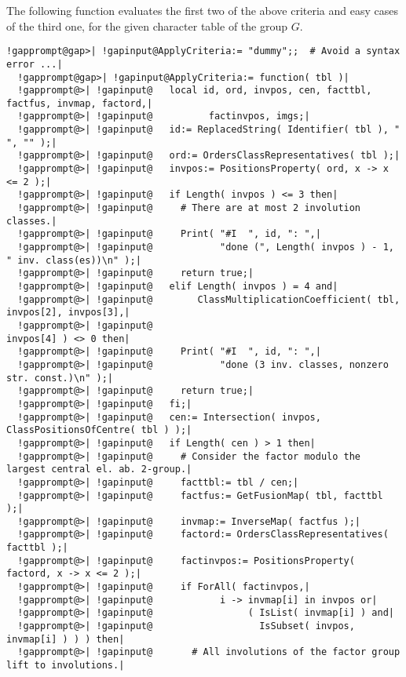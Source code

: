 \documentclass[a4paper,11pt]{report}
\begin{document}
{{{ The following function evaluates the first two of the above criteria and easy
cases of the third one, for the given character table of the group $G$. 

 
\begin{Verbatim}[commandchars=!@|,fontsize=\small,frame=single,label=Example]
  !gapprompt@gap>| !gapinput@ApplyCriteria:= "dummy";;  # Avoid a syntax error ...|
  !gapprompt@gap>| !gapinput@ApplyCriteria:= function( tbl )|
  !gapprompt@>| !gapinput@   local id, ord, invpos, cen, facttbl, factfus, invmap, factord,|
  !gapprompt@>| !gapinput@          factinvpos, imgs;|
  !gapprompt@>| !gapinput@   id:= ReplacedString( Identifier( tbl ), " ", "" );|
  !gapprompt@>| !gapinput@   ord:= OrdersClassRepresentatives( tbl );|
  !gapprompt@>| !gapinput@   invpos:= PositionsProperty( ord, x -> x <= 2 );|
  !gapprompt@>| !gapinput@   if Length( invpos ) <= 3 then|
  !gapprompt@>| !gapinput@     # There are at most 2 involution classes.|
  !gapprompt@>| !gapinput@     Print( "#I  ", id, ": ",|
  !gapprompt@>| !gapinput@            "done (", Length( invpos ) - 1, " inv. class(es))\n" );|
  !gapprompt@>| !gapinput@     return true;|
  !gapprompt@>| !gapinput@   elif Length( invpos ) = 4 and|
  !gapprompt@>| !gapinput@        ClassMultiplicationCoefficient( tbl, invpos[2], invpos[3],|
  !gapprompt@>| !gapinput@                                             invpos[4] ) <> 0 then|
  !gapprompt@>| !gapinput@     Print( "#I  ", id, ": ",|
  !gapprompt@>| !gapinput@            "done (3 inv. classes, nonzero str. const.)\n" );|
  !gapprompt@>| !gapinput@     return true;|
  !gapprompt@>| !gapinput@   fi;|
  !gapprompt@>| !gapinput@   cen:= Intersection( invpos, ClassPositionsOfCentre( tbl ) );|
  !gapprompt@>| !gapinput@   if Length( cen ) > 1 then|
  !gapprompt@>| !gapinput@     # Consider the factor modulo the largest central el. ab. 2-group.|
  !gapprompt@>| !gapinput@     facttbl:= tbl / cen;|
  !gapprompt@>| !gapinput@     factfus:= GetFusionMap( tbl, facttbl );|
  !gapprompt@>| !gapinput@     invmap:= InverseMap( factfus );|
  !gapprompt@>| !gapinput@     factord:= OrdersClassRepresentatives( facttbl );|
  !gapprompt@>| !gapinput@     factinvpos:= PositionsProperty( factord, x -> x <= 2 );|
  !gapprompt@>| !gapinput@     if ForAll( factinvpos,|
  !gapprompt@>| !gapinput@            i -> invmap[i] in invpos or|
  !gapprompt@>| !gapinput@                 ( IsList( invmap[i] ) and|
  !gapprompt@>| !gapinput@                   IsSubset( invpos, invmap[i] ) ) ) then|
  !gapprompt@>| !gapinput@       # All involutions of the factor group lift to involutions.|

\end{Verbatim}}}}
\end{document}
